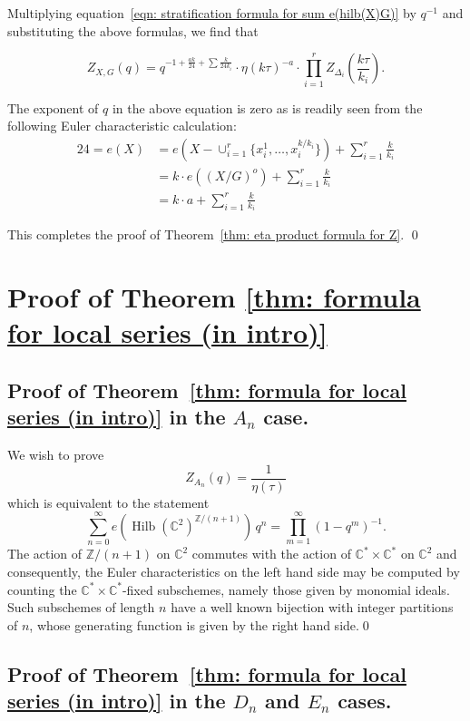 \documentclass{article}
\theoremstyle{definition}
\newcommand{\CC} {{\mathbb C}}          %
\newcommand{\ZZ} {{\mathbb Z}}		%
\newcommand{\Hilb}{\operatorname{Hilb}}
\begin{document}
Multiplying equation~\eqref{eqn: stratification formula for sum
e(hilb(X)G)} by $q^{-1}$ and substituting the above formulas, we find
that

\[
Z_{X,G}(q) = q^{-1 +\frac{ak}{24} + \sum \frac{k}{24k_{i}} } \cdot 
\eta (k\tau )^{-a}\cdot 
\prod_{i=1}^{r}Z_{\Delta_{i}}\left(\frac{k\tau}{k_{i}} \right) .
\]

The exponent of $q$ in the above equation is zero as is readily seen
from the following Euler characteristic calculation:
\begin{align*}
24 = e(X) &= e\left(X-\cup_{i=1}^{r} \{x_{i}^{1},\dotsc
,x_{i}^{k/k_{i}} \} \right) + \sum_{i=1}^{r} \frac{k}{k_{i}} \\
&= k \cdot e\left((X/G)^{o} \right) + \sum_{i=1}^{r} \frac{k}{k_{i}} \\
&= k\cdot a + \sum_{i=1}^{r}\frac{k}{k_{i}} 
\end{align*}

This completes the proof of Theorem~\ref{thm: eta product formula for
Z}.  \qed


\section{Proof of Theorem \ref{thm: formula for local series (in
intro)}}\label{sec: proof of formula for local series}

\subsection{Proof of Theorem~\ref{thm: formula for local series (in
intro)} in the $A_{n}$ case.}\label{subsec: proof of An case of
local series}

We wish to prove
\[
Z_{A_{n}}(q) = \frac{1}{\eta (\tau )}
\]
which is equivalent to the statement
\[
\sum_{n=0}^{\infty} e\left(\Hilb (\CC^{2})^{\ZZ /(n+1)} \right)
\,q^{n} = \prod_{m=1}^{\infty} (1-q^{m})^{-1}.
\]
The action of $\ZZ /(n+1)$ on $\CC^{2}$ commutes with the action of
$\CC^{*}\times \CC^{*}$ on $\CC^{2}$ and consequently, the Euler
characteristics on the left hand side may be computed by counting
the $\CC^{*}\times \CC^{*}$-fixed subschemes, namely those given by
monomial ideals. Such subschemes of length $n$ have a well known
bijection with integer partitions of $n$, whose generating function is
given by the right hand side.\qed 

\subsection{Proof of Theorem~\ref{thm: formula for local series (in
intro)} in the $D_{n}$ and $E_{n}$ cases.}\label{subsec: proof of Dn
and En cases of local series}
\end{document}
